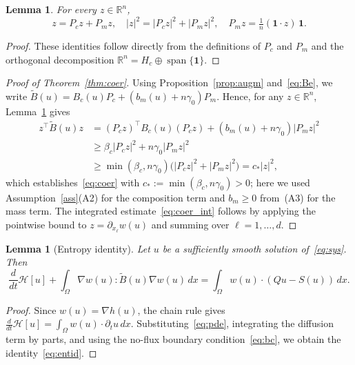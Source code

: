 \documentclass{article}
\newtheorem{lemma}[theorem]{Lemma}
\newcommand{\R}{\mathbb{R}}
\newcommand{\bone}{\mathbf{1}}
\newcommand{\Be}{\widetilde{B}}       %
\newcommand{\HH}{\mathcal{H}}         %
\newcommand{\Pc}{P_c}                 %
\newcommand{\Pm}{P_m}                 %
\newcommand{\Hc}{H_c}                 %
\begin{document}
\begin{lemma}\label{lem:decomp}
For every $z\in\R^n$,
\[
  z = \Pc z + \Pm z,\quad
  |z|^2 = |\Pc z|^2 + |\Pm z|^2,\quad
  \Pm z = \tfrac{1}{n}(\bone\cdot z)\,\bone.
\]
\end{lemma}

\begin{proof}
These identities follow directly from the definitions of $\Pc$ and $\Pm$
and the orthogonal decomposition $\R^n = \Hc\oplus\operatorname{span}\{\bone\}$.
\end{proof}

\begin{proof}[Proof of Theorem~\ref{thm:coer}]
Using Proposition~\ref{prop:augm} and~\eqref{eq:Be}, we write
$\Be(u) = B_c(u)\Pc + (b_m(u)+n\gamma_0)\Pm$.
Hence, for any $z\in\R^n$, Lemma~\ref{lem:decomp} gives
\begin{align*}
  z^\top\Be(u)z
  &= (\Pc z)^\top B_c(u)(\Pc z) + (b_m(u)+n\gamma_0)|\Pm z|^2 \\
  &\ge \beta_c|\Pc z|^2 + n\gamma_0|\Pm z|^2 \\
  &\ge \min(\beta_c,n\gamma_0)\bigl(|\Pc z|^2+|\Pm z|^2\bigr)
   = c_*|z|^2,
\end{align*}
which establishes~\eqref{eq:coer} with $c_* := \min(\beta_c,n\gamma_0)>0$; here we used
Assumption~\ref{ass}(A2) for the composition term and $b_m\ge 0$
from~(A3) for the mass term.
The integrated estimate~\eqref{eq:coer_int} follows by applying the
pointwise bound to $z = \partial_{x_\ell}w(u)$ and summing over
$\ell=1,\dots,d$.
\end{proof}

\begin{lemma}[Entropy identity]\label{lem:entid}
Let $u$ be a sufficiently smooth solution of~\eqref{eq:sys}. Then
\begin{equation}\label{eq:entid}
  \frac{d}{dt}\HH[u]
  + \int_\Omega \nabla w(u):\Be(u)\nabla w(u)\,dx
  = \int_\Omega w(u)\cdot(Qu-S(u))\,dx.
\end{equation}
\end{lemma}

\begin{proof}
Since $w(u)=\nabla h(u)$, the chain rule gives
$\frac{d}{dt}\HH[u] = \int_\Omega w(u)\cdot\partial_t u\,dx$.
Substituting~\eqref{eq:pde}, integrating the diffusion term by parts,
and using the no-flux boundary condition~\eqref{eq:bc}, we obtain the
identity~\eqref{eq:entid}.
\end{proof}

\end{document}
